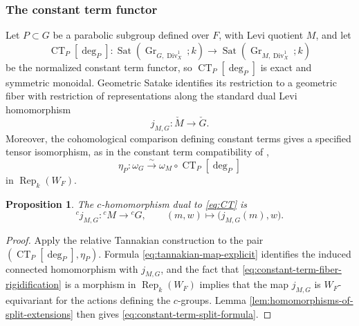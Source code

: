 \documentclass[reqno]{amsart}
\numberwithin{equation}{subsection}
\newcommand{\co}{\colon}
\newcommand{\lc}{{}^c}
\DeclareMathOperator{\Rep}{Rep}
\DeclareMathOperator{\Div}{Div}
\DeclareMathOperator{\Gr}{Gr}
\DeclareMathOperator{\Sat}{Sat}
\DeclareMathOperator{\CT}{CT}
\newtheorem{prop}[thm]{Proposition}
\theoremstyle{remark}
\numberwithin{equation}{subsection}
\numberwithin{figure}{subsection}
\begin{document}
\subsubsection{The constant term functor}
\label{sssec:constant-term-L-group-calculation}

Let $P\subset G$ be a parabolic subgroup defined over $F$, with Levi quotient
$M$, and let
\begin{equation}\label{eq:CT}
\CT_P[\deg_P]\co
\Sat(\Gr_{G,\Div_X^1};k)
\longrightarrow
\Sat(\Gr_{M,\Div_X^1};k)
\end{equation}
be the normalized constant term functor, so $\CT_P[\deg_P]$ is exact and symmetric monoidal.  Geometric Satake
identifies its restriction to a geometric fiber with restriction of
representations along the standard dual Levi homomorphism
\[
j_{M,G}\co\check M\longrightarrow\check G.
\]
Moreover, the cohomological comparison defining constant terms gives a
specified tensor isomorphism, as in the constant term compatibility of
\cite[\S VI.3 and \S VI.11]{FS},
\begin{equation}\label{eq:constant-term-fiber-rigidification}
\eta_P\co\omega_G
\xrightarrow{\sim}
\omega_M\circ\CT_P[\deg_P]
\end{equation}
in $\Rep_k(W_F)$.

\begin{prop}\label{prop:constant-term-split-c-map}
The $c$-homomorphism dual to \eqref {eq:CT} is
\begin{equation}\label{eq:constant-term-split-formula}
\lc j_{M,G}\co\lc M\longrightarrow \lc G,
\qquad
(m,w)\longmapsto\bigl(j_{M,G}(m),w\bigr).
\end{equation}
\end{prop}

\begin{proof}
Apply the relative Tannakian construction to the pair
$(\CT_P[\deg_P],\eta_P)$.  Formula
\eqref{eq:tannakian-map-explicit} identifies the induced connected
homomorphism with $j_{M,G}$, and the fact that \eqref{eq:constant-term-fiber-rigidification}
is a morphism in $\Rep_k(W_F)$ implies that the map $j_{M,G}$ is $W_F$-equivariant for the actions defining the $c$-groups.  Lemma \ref{lem:homomorphisms-of-split-extensions} then
gives \eqref{eq:constant-term-split-formula}.
\end{proof}
\end{document}
